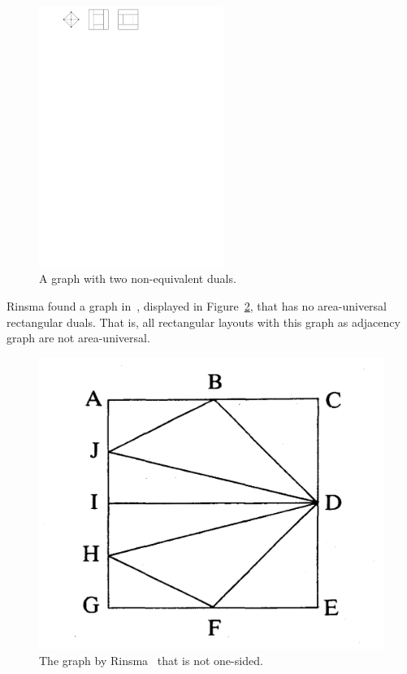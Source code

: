   \begin{figure}
    \centering
    \includegraphics[width=6cm]{introduction/img/nonuniqueRectDual.pdf}
    \caption{A graph with two non-equivalent duals.}
    \label{fig:intro:nonuniqueRectDual}
  \end{figure}

  Rinsma found a graph in~\cite{Rinsma1987}, displayed in Figure~\ref{fig:intro:rinsma}, that has no area-universal rectangular duals.
  That is, all rectangular layouts with this graph as adjacency graph are not area-universal.

  \begin{figure}  %
    \includegraphics[scale=.15]{introduction/img/rinsma.png}
    \caption{The graph by Rinsma~\cite{Rinsma1987} that is not one-sided.}
    \label{fig:intro:rinsma}
  \end{figure}

